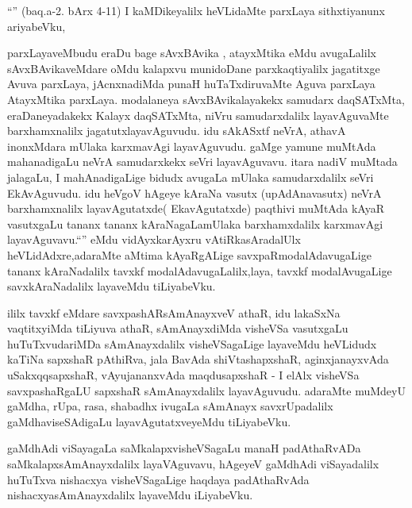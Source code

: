 \begin{artha}
``\stext'' (baq.a-2. bArx 4-11) I kaMDikeyalilx heVLidaMte parxLaya
 sithxtiyanunx ariyabeVku,
\end{artha}

\begin{center}


\end{center}

\begin{artha}
parxLayaveMbudu eraDu bage sAvxBAvika , atayxMtika eMdu avugaLalilx
sAvxBAvikaveMdare oMdu kalapxvu munidoDane parxkaqtiyalilx jagatitxge
Avuva parxLaya, jAcnxnadiMda punaH huTaTxdiruvaMte Aguva parxLaya
AtayxMtika parxLaya. modalaneya sAvxBAvikalayakekx samudarx
daqSATxMta, eraDaneyadakekx Kalayx daqSATxMta, niVru samudarxdalilx
layavAguvaMte barxhamxnalilx jagatutxlayavAguvudu. idu sAkASxtf neVrA, athavA
inonxMdara mUlaka karxmavAgi layavAguvudu. gaMge yamune muMtAda
mahanadigaLu neVrA samudarxkekx seVri layavAguvavu. itara nadiV
muMtada jalagaLu, I mahAnadigaLige bidudx avugaLa mUlaka
samudarxdalilx seVri EkAvAguvudu. idu heVgoV hAgeye kAraNa vasutx
(upAdAnavasutx) neVrA barxhamxnalilx layavAgutatxde( EkavAgutatxde)
paqthivi muMtAda kAyaR vasutxgaLu tananx tananx kAraNagaLamUlaka
barxhamxdalilx karxmavAgi layavAguvavu.``\stext'' eMdu vidAyxkarAyxru
vAtiRkasAradalUlx heVLidAdxre,adaraMte aMtima kAyaRgALige
savxpaRmodalAdavugaLige tananx kAraNadalilx tavxkf
modalAdavugaLalilx,laya, tavxkf modalAvugaLige savxkAraNadalilx
layaveMdu tiLiyabeVku.
\end{artha}

\begin{artha}
ililx tavxkf eMdare savxpashARsAmAnayxveV athaR, idu lakaSxNa
vaqtitxyiMda tiLiyuva athaR, sAmAnayxdiMda visheVSa vasutxgaLu
huTuTxvudariMDa sAmAnayxdalilx visheVSagaLige layaveMdu heVLidudx
kaTiNa sapxshaR pAthiRva, jala BavAda shiVtashapxshaR, aginxjanayxvAda
uSakxqqsapxshaR, vAyujananxvAda maqdusapxshaR - I elAlx visheVSa
savxpashaRgaLU sapxshaR sAmAnayxdalilx layavAguvudu. adaraMte muMdeyU
gaMdha, rUpa, rasa, shabadhx ivugaLa sAmAnayx savxrUpadalilx
gaMdhaviseSAdigaLu layavAgutatxveyeMdu tiLiyabeVku.
\end{artha}

\begin{artha}

gaMdhAdi viSayagaLa saMkalapxvisheVSagaLu manaH padAthaRvADa
saMkalapxsAmAnayxdalilx layaVAguvavu, hAgeyeV gaMdhAdi viSayadalilx
huTuTxva nishacxya visheVSagaLige haqdaya padAthaRvAda
nishacxyasAmAnayxdalilx layaveMdu iLiyabeVku.
\end{artha}

